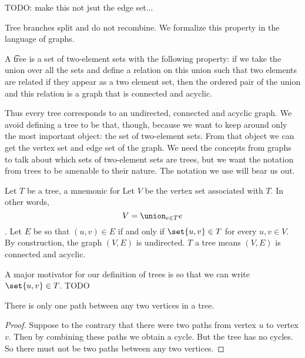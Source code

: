 
TODO: make this not jsut the edge set...

Tree branches split and do not recombine.
We formalize this property in the language of graphs.


A \t{tree} is a set of two-element sets with the following property: if we take the union over all the sets and define a relation on this union such that two elements are related if they appear as a two element set, then the ordered pair of the union and this relation is a graph that is connected and acyclic.

Thus every tree corresponds to an undirected, connected and acyclic graph.
We avoid defining a tree to be that, though, because we want to keep around only the most important object: the set of two-element sets.
From that object we can get the vertex set and edge set of the graph.
We need the concepts from graphs to talk about which sets of two-element sets are trees, but we want the notation from trees to be amenable to their nature.
The notation we use will bear us out.


Let $T$ be a tree, a mnemonic for 
Let $V$ be the vertex set associated with $T$.
In other words, $$V = \union_{e \in T} e$$.
Let $E$ be so that $(u, v) \in E$ if and only if $\set{u, v} \in T$ for every $u, v \in V$.
By construction, the graph $(V, E)$ is undirected.
$T$ a tree means $(V, E)$ is connected and acyclic.

A major motivator for our definition of trees is so that we can write $\set{u, v} \in T$. TODO

%
%

\begin{prop}

There is only one path between any two vertices in a tree.

\begin{proof}

Suppose to the contrary that there were two paths from vertex $u$ to vertex $v$.
Then by combining these paths we obtain a cycle.
But the tree has no cycles.
So there must not be two paths between any two vertices.
\end{proof}

\end{prop}
